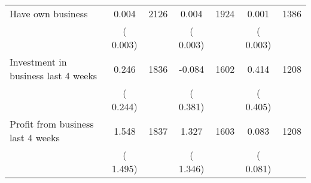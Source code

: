 \begin{tabular}{l*{6}{c}}
Have own business        &              0.004      &       2126       &              0.004      &       1924       &              0.001      &       1386       \\
                       &       (       0.003)            &                               &       (       0.003)            &                               &       (       0.003)            &                               \\
Investment in business last 4 weeks        &              0.246      &       1836       &             -0.084      &       1602       &              0.414      &       1208       \\
                       &       (       0.244)            &                               &       (       0.381)            &                               &       (       0.405)            &                               \\
Profit from business last 4 weeks        &              1.548      &       1837       &              1.327      &       1603       &              0.083      &       1208       \\
                       &       (       1.495)            &                               &       (       1.346)            &                               &       (       0.081)            &                               \\
\hline \end{tabular}